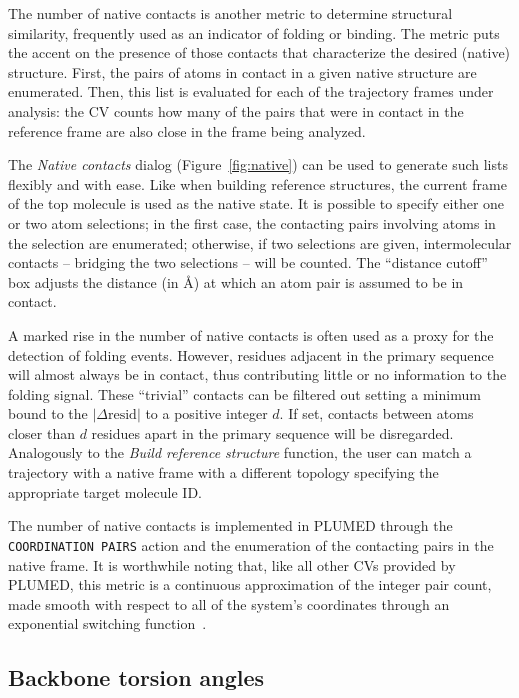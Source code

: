\documentclass[preprint,review,11pt]{elsarticle}
\begin{document}
The number of native contacts is another metric  to
determine structural similarity, frequently used as an indicator of folding
or binding.  The metric puts the accent on the presence of those
contacts that characterize the desired (native) structure. First, the
pairs of atoms in contact in a given native structure are
enumerated. Then, this list is evaluated
for each of the trajectory frames under analysis: the 
CV counts how many of the pairs that were in contact in the
reference frame are also close in the frame being analyzed.  

The \emph{Native contacts} dialog (Figure~\ref{fig:native}) can be
used to generate such lists flexibly and with ease. Like when building
reference structures, the current frame of the top molecule is used as
the native state.  It is possible to specify either one or two atom
selections; in the first case, the contacting pairs involving atoms in
the selection are enumerated; otherwise, if two selections are given,
intermolecular contacts -- bridging the two selections -- will be
counted.  The ``distance cutoff'' box adjusts the distance (in \AA) at
which an atom pair is assumed to be in contact.

A marked rise in the number of native contacts is often used as a
proxy for the detection of folding events. However, residues adjacent
in the primary sequence will almost always be in contact, thus
contributing little or no information to the folding signal. These
``trivial'' contacts can be filtered out setting a minimum bound to
the $| \Delta \mbox{resid} |$ to a positive integer $d$. If set,
contacts between atoms closer than $d$ residues apart in the
primary sequence will be disregarded.
Analogously to the \emph{Build reference structure} function, the user
can match a trajectory with a native frame with a different topology
specifying the appropriate target molecule ID.

The number of native contacts is implemented in PLUMED through the
\texttt{COORDINATION PAIRS} action and the enumeration of the
contacting pairs in the native frame.  It is worthwhile noting that,
like all other CVs provided by PLUMED, this metric is a continuous
approximation of the integer pair count, made smooth with respect to
all of the system's coordinates through an exponential switching
function~\cite{plumed_manual}.




\subsection{Backbone torsion angles}
\end{document}

